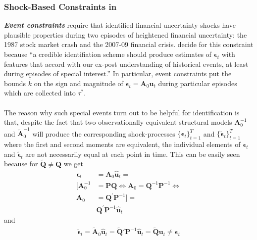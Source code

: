 \documentclass[a4paper,11pt,listof=nochaptergap,oneside,pointednumbers,bibtotoc,bigheadings,liststotoc]{scrbook}
\theoremstyle{mysatz}
\theoremstyle{mydefinition}
\theoremstyle{mybemerkung}
\renewcommand*{\paragraph}[1]{\subsubsection*{#1} \vspace{-3mm}} %
\let\oldhat\hat
\newcommand{\vect}[1]{\boldsymbol{\mathbf{#1}}}
\newcommand{\hatt}[1]{\oldhat{\boldsymbol{\mathbf{#1}}}}
\begin{document}
\paragraph{Shock-Based Constraints in \citet{ludvigsonetal:18}}
\textbf{\textit{Event constraints}} require that identified financial uncertainty shocks have plausible properties during two episodes of heightened financial uncertainty: the 1987 stock market crash and the 2007-09 financial crisis. \citet{ludvigsonetal:18} decide for this constraint because ``a credible identifiation scheme should produce estimates of $\vect{\epsilon}_t$ with features that accord with our ex-post understanding of historical events, at least during episodes of special interest.'' \citep[p. 7]{ludvigsonetal:18}  In particular, event constraints put the bounds $\overline{k}$ on the sign and magnitude of $\vect{\epsilon}_t = \vect{A}_0\vect{u}_t$ during particular episodes which are collected into $\tau^*$. \\
\\
The reason why such special events turn out to be helpful for identification is that, despite the fact that two observationally equivalent structural models $\vect{A}_0^{-1}$ and $\widetilde{\vect{A}}_0^{-1}$ will produce the corresponding shock-processes $\big\{\vect{\epsilon}_t\big\}_{t=1}^T$ and $\big\{\widetilde{\vect{\epsilon}}_t\big\}_{t=1}^T$ where the first and second moments are equivalent, the individual elements of $\vect{\epsilon}_t$ and $\widetilde{\vect{\epsilon}}_t$ are not necessarily equal at each point in time. This can be easily seen because for $\widetilde{\vect{Q}} \neq \vect{Q}$ we get 
\begin{equation} \label{eq:svar_ludvi9}
\begin{split}
\vect{\epsilon}_t & = \vect{A}_0\hatt{\vect{u}}_t = \\
[\vect{A}_0^{-1} & = \vect{P}\vect{Q} \iff \vect{A}_0 = \vect{Q}^{-1}\vect{P}^{-1} \iff \\
\vect{A}_0 & = \vect{Q}^{'}\vect{P}^{-1}] = \\
	& \vect{Q}^'\vect{P}^{-1}\hatt{\vect{u}}_t 
\end{split}								
\end{equation}
and 
\begin{equation} \label{eq:svar_ludvi10}
\begin{split}
\widetilde{\vect{\epsilon}}_t = \widetilde{\vect{A}}_0\hatt{\vect{u}}_t = \widetilde{\vect{Q}}'\vect{P}^{-1}\hatt{\vect{u}}_t = \widetilde{\vect{Q}}\vect{u}_t \neq \vect{\epsilon}_t
\end{split}								
\end{equation}
\end{document}
